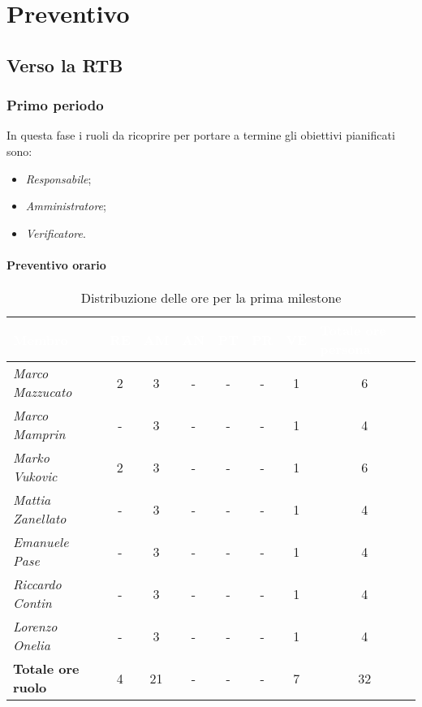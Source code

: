 \chapter{Preventivo}

\section{Verso la RTB}

\subsection{Primo periodo}

In questa fase i ruoli da ricoprire per portare a termine gli obiettivi
pianificati sono:
\begin{itemize}
    \item \textit{Responsabile};
    \item \textit{Amministratore};
    \item \textit{Verificatore}.
\end{itemize}

\subsubsection{Preventivo orario}

\begin{table}[H]
    \renewcommand\arraystretch{1.5}
    \centering
    \begin{tabular}{|l|c|c|c|c|c|c|c|}
    \hline
    \rowcolor[HTML]{036400}
    \textcolor{white}{\textbf{Membro}} & \multicolumn{1}{l|}{\textcolor{white}{\textbf{RE}}} & \multicolumn{1}{l|}{\textcolor{white}{\textbf{AM}}} & \multicolumn{1}{l|}{\textcolor{white}{\textbf{AN}}} & \multicolumn{1}{l|}{\textcolor{white}{\textbf{PT}}} & \multicolumn{1}{l|}{\textcolor{white}{\textbf{PR}}} & \multicolumn{1}{l|}{\textcolor{white}{\textbf{VE}}} & \multicolumn{1}{l|}{\textcolor{white}{\textbf{Totale ore persona}}} \\ \hline
    \rowcolor[HTML]{EFEFEF}\textit{Marco Mazzucato}  & 2 & 3  & - & - & - & 1 & 6  \\ \hline
    \rowcolor[HTML]{C0C0C0}\textit{Marco Mamprin}    & - & 3  & - & - & - & 1 & 4  \\ \hline
    \rowcolor[HTML]{EFEFEF}\textit{Marko Vukovic}    & 2 & 3  & - & - & - & 1 & 6  \\ \hline
    \rowcolor[HTML]{C0C0C0}\textit{Mattia Zanellato} & - & 3  & - & - & - & 1 & 4  \\ \hline
    \rowcolor[HTML]{EFEFEF}\textit{Emanuele Pase}    & - & 3  & - & - & - & 1 & 4  \\ \hline
    \rowcolor[HTML]{C0C0C0}\textit{Riccardo Contin}  & - & 3  & - & - & - & 1 & 4  \\ \hline
    \rowcolor[HTML]{EFEFEF}\textit{Lorenzo Onelia}   & - & 3  & - & - & - & 1 & 4  \\ \hline
    \textbf{Totale ore ruolo} & 4 & 21 & - & - & - & 7 & 32 \\ \hline
    \end{tabular}
    \caption{Distribuzione delle ore per la prima milestone}
\end{table}

